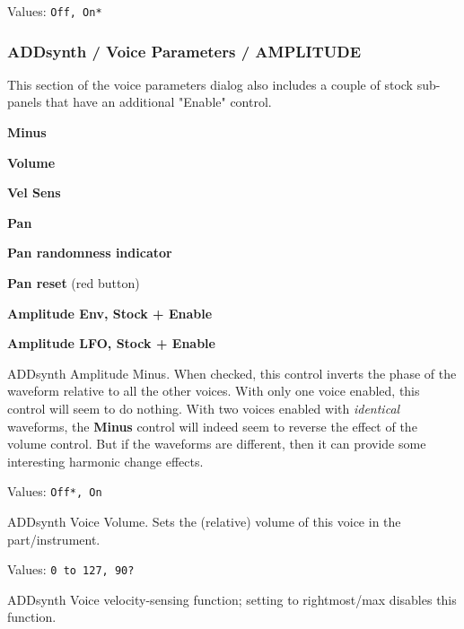    Values: \texttt{Off, On*}

\subsubsection{ADDsynth / Voice Parameters / AMPLITUDE}
\label{subsubsec:addsynth_voice_parameters_amplitude}

   This section of the voice parameters dialog also includes a couple of
   stock sub-panels that have an additional "Enable" control.

   \begin{enumber}
      \item \textbf{Minus}
      \item \textbf{Volume}
      \item \textbf{Vel Sens}
      \item \textbf{Pan}
      \item \textbf{Pan randomness indicator}
      \item \textbf{Pan reset} (red button)
      \item \textbf{Amplitude Env, Stock + Enable}
      \item \textbf{Amplitude LFO, Stock + Enable}
   \end{enumber}

   \setcounter{ItemCounter}{0}      %

   ADDsynth Amplitude Minus.
   When checked, this control inverts the phase of the waveform relative to all
   the other voices.
   With only one voice enabled, this control will seem to do nothing.
   With two voices enabled with \textsl{identical} waveforms, the
   \textbf{Minus} control will indeed seem to reverse the effect of the volume
   control. But if the waveforms are different, then it can provide some
   interesting harmonic change effects.

   Values: \texttt{Off*, On}

   ADDsynth Voice Volume.
   Sets the (relative) volume of this voice in the part/instrument.

   Values: \texttt{0 to 127, 90?}

   ADDsynth Voice velocity-sensing function; setting to rightmost/max
   disables this function.

